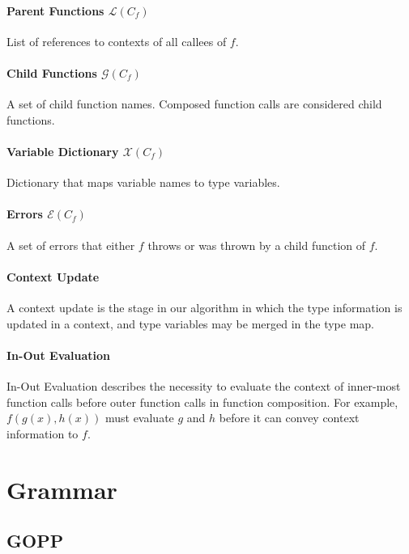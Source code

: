 \documentclass[10pt]{article}
\begin{document}
	\paragraph{Parent Functions $\mathcal{L}(C_f)$}
	List of references to contexts of all callees of $f$.

	\paragraph{Child Functions $\mathcal{G}(C_f)$}
	A set of child function names. Composed function calls are considered child
	functions.

	\paragraph{Variable Dictionary $\mathcal{X}(C_f)$}
	Dictionary that maps variable names to type variables.

	\paragraph{Errors $\mathcal{E}(C_f)$}
	A set of errors that either $f$ throws or was thrown by a child function of
	$f$.

	\paragraph{Context Update}
	A context update is the stage in our algorithm in which the type
	information is updated in a context, and type variables may be merged in
	the type map.

	\paragraph{In-Out Evaluation} 
	In-Out Evaluation describes the necessity to
	evaluate the context of inner-most function calls before outer function
	calls in function composition. For example, $f(g(x),h(x))$ must evaluate
	$g$ and $h$ before it can convey context information to $f$.

\pagebreak

\section{Grammar}

\subsection{GOPP}
\end{document}
